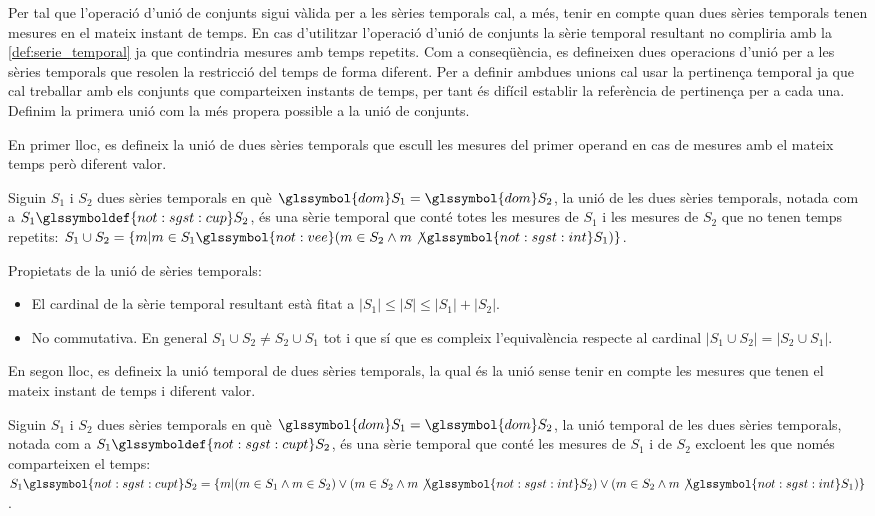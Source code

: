 Per tal que l'operació d'unió de conjunts sigui vàlida per a les
sèries temporals cal, a més, tenir en compte quan dues sèries
temporals tenen mesures en el mateix instant de temps. En cas
d'utilitzar l'operació d'unió de conjunts la sèrie temporal resultant
no compliria amb la \autoref{def:serie_temporal} ja que contindria
mesures amb temps repetits. Com a conseqüència, es defineixen dues
operacions d'unió per a les sèries temporals que resolen la restricció
del temps de forma diferent.  Per a definir ambdues unions cal usar la
pertinença temporal ja que cal treballar amb els conjunts que
comparteixen instants de temps, per tant és difícil establir la
referència de pertinença per a cada una.  Definim la primera unió com
la més propera possible a la unió de conjunts.



En primer lloc, es defineix la unió de dues sèries temporals que
escull les mesures del primer operand en cas de mesures amb el mateix
temps però diferent valor.
\begin{definition}[Unió]
  Siguin $S_1$ i $S_2$ dues sèries temporals en què $\glssymbol{dom}
  S_1 = \glssymbol{dom} S_2$, la unió de les dues sèries temporals,
  notada com a $S_1 \glssymboldef{not:sgst:cup} S_2$, és una sèrie
  temporal que conté totes les mesures de $S_1$ i les mesures de $S_2$
  que no tenen temps repetits: $S_1 \cup S_2 = \{m | m \in S_1
  \glssymbol{not:vee} (m \in S_2 \wedge m \not\glssymbol{not:sgst:int}
  S_1 )\}$.
\end{definition}

Propietats de la unió de sèries temporals:
\begin{itemize}
\item El cardinal de la sèrie temporal resultant està fitat a
  $|S_1| \leq |S| \leq |S_1| + |S_2|$. 
\item No commutativa. En general
  $S_1\cup S_2 \neq S_2\cup S_1$ tot i que sí que es compleix
  l'equivalència respecte al cardinal $|S_1 \cup S_2| = |S_2\cup S_1|$.
\end{itemize}

En segon lloc, es defineix la unió temporal de dues sèries temporals,
la qual és la unió sense tenir en compte les mesures que tenen el mateix
instant de temps i diferent valor.
\begin{definition}
  Siguin $S_1$ i $S_2$ dues sèries temporals en què $\glssymbol{dom}
  S_1 = \glssymbol{dom} S_2$, la unió temporal de les
  dues sèries temporals, notada com a $S_1
  \glssymboldef{not:sgst:cupt} S_2$, és una sèrie temporal que conté
  les mesures de $S_1$ i de $S_2$ excloent les que només comparteixen
  el temps: $S_1 \glssymbol{not:sgst:cupt} S_2 = \{ m | (m \in S_1
  \wedge m \in S_2 ) \vee ( m \in S_2 \wedge m
  \not\glssymbol{not:sgst:int} S_2) \vee (m \in S_2 \wedge m
  \not\glssymbol{not:sgst:int} S_1 )\}$.
\end{definition}


